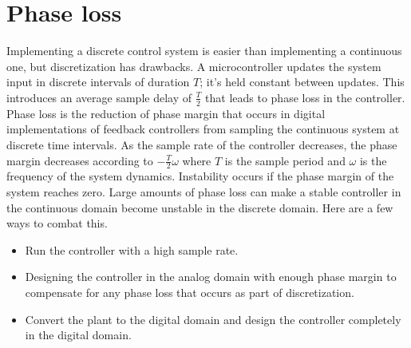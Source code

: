 \section{Phase loss}

Implementing a discrete control system is easier than implementing a continuous
one, but \gls{discretization} has drawbacks. A microcontroller updates the
system input in discrete intervals of duration $T$; it's held constant between
updates. This introduces an average sample delay of $\frac{T}{2}$ that leads to
phase loss in the controller. Phase loss is the reduction of \gls{phase margin}
that occurs in digital implementations of feedback controllers from sampling the
continuous \gls{system} at discrete time intervals. As the sample rate of the
controller decreases, the \gls{phase margin} decreases according to
$-\frac{T}{2}\omega$ where $T$ is the sample period and $\omega$ is the
frequency of the \gls{system} dynamics. Instability occurs if the \gls{phase
margin} of the \gls{system} reaches zero. Large amounts of phase loss can make a
stable controller in the continuous domain become unstable in the discrete
domain. Here are a few ways to combat this.
\begin{itemize}
  \item Run the controller with a high sample rate.
  \item Designing the controller in the analog domain with enough
    \gls{phase margin} to compensate for any phase loss that occurs as part of
    \gls{discretization}.
  \item Convert the \gls{plant} to the digital domain and design the controller
    completely in the digital domain.
\end{itemize}
